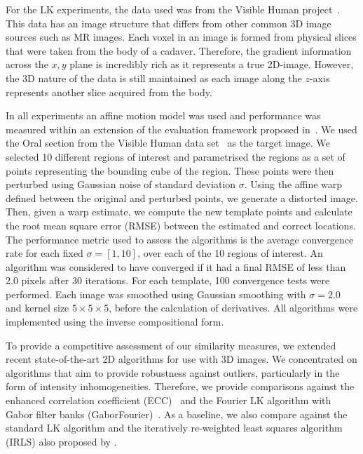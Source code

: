 For the LK experiments, the data used was from the Visible Human
project~\cite{spitzer1996visiblehuman}. 
This data has an image structure that differs from
other common 3D image sources such as MR images. Each voxel in an image is
formed from physical slices that were taken from the body of a cadaver.
Therefore, the gradient information across the $x, y$ plane is incredibly rich
as it represents a true 2D-image. However, the 3D nature of the data is still
maintained as each image along the $z$-axis represents another slice acquired
from the body.

In all experiments an affine motion model was used and performance was measured
within an extension of the evaluation framework proposed 
in~\cite{tzimiropoulos2011robust}.
We used the Oral section from the Visible Human data 
set~\cite{spitzer1996visiblehuman} as
the target image. We selected 10 different regions of interest and parametrised
the regions as a set of points representing the bounding cube of the region.
These points were then perturbed using Gaussian noise of standard deviation
$\sigma$. Using the affine warp defined between the original and perturbed
points, we generate a distorted image. Then, given a warp estimate, we compute
the new template points and calculate the root mean square error (RMSE) between
the estimated and correct locations. The performance metric used to assess the
algorithms is the average convergence rate for each fixed $\sigma = [1, 10]$,
over each of the 10 regions of interest. An algorithm was considered to have
converged if it had a final RMSE of less than $2.0$ pixels after 30 iterations.
For each template, 100 convergence tests were performed. Each image was smoothed
using Gaussian smoothing with $\sigma = 2.0$ and kernel size $5\times5\times5$,
before the calculation of derivatives. All algorithms were implemented using the
inverse compositional form.

To provide a competitive assessment of our similarity measures, we extended
recent state-of-the-art 2D algorithms for use with 3D images. We concentrated on
algorithms that aim to provide robustness against outliers, particularly in the
form of intensity inhomogeneities. Therefore, we provide comparisons against the
enhanced correlation coefficient (ECC)~\cite{evangelidis2008parametric} 
and the Fourier LK
algorithm with Gabor filter banks (GaborFourier)~\cite{lucey2013fourier}. As a
baseline, we also compare against the standard LK algorithm and the iteratively
re-weighted least squares algorithm (IRLS) also proposed by
\citet{baker2005lk20yearsonpart5}.

